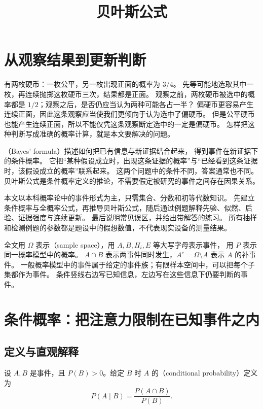 \documentclass[UTF8]{ctexart}
\title{贝叶斯公式}
\author{}
\date{}
\begin{document}
\maketitle
\tableofcontents

\section{从观察结果到更新判断}
\label{sec:bayes-introduction}

有两枚硬币：一枚公平，另一枚出现正面的概率为 $3/4$。
先等可能地选取其中一枚，再连续抛掷这枚硬币三次，结果都是正面。
观察之前，两枚硬币被选中的概率都是 $1/2$；观察之后，是否仍应当认为两种可能各占一半？
偏硬币更容易产生连续正面，因此这条观察应当使我们更倾向于认为选中了偏硬币。
但是公平硬币也能产生连续正面，所以不能仅凭这条观察断定选中的一定是偏硬币。
怎样把这种判断写成准确的概率计算，就是本文要解决的问题。

（Bayes' formula）描述如何把已有信息与新证据结合起来，
得到事件在新证据下的条件概率。
它把“某种假设成立时，出现这条证据的概率”与“已经看到这条证据时，该假设成立的概率”联系起来。
这两个问题中的条件不同，答案通常也不同。
贝叶斯公式是条件概率定义的推论，不需要假定被研究的事件之间存在因果关系。

本文以本科概率论中的事件形式为主，只需集合、分数和初等代数知识。
先建立条件概率与全概率公式，再推导贝叶斯公式，随后通过例题解释先验、似然、后验、证据强度与连续更新。
最后说明常见误区，并给出带解答的练习。
所有抽样和检测例题的参数都是题设中的假想数值，不代表现实设备的测量结果。

全文用 $\Omega$ 表示（sample space），用 $A,B,H_i,E$ 等大写字母表示事件，
用 $P$ 表示同一概率模型中的概率。
$A\cap B$ 表示两事件同时发生，$A^c=\Omega\setminus A$ 表示 $A$ 的补事件。
一般概率模型中的事件属于给定的事件族；有限样本空间中，可以把每个子集都作为事件。
条件竖线右边写已知信息，左边写在这些信息下仍要判断的事件。

\section{条件概率：把注意力限制在已知事件之内}
\label{sec:bayes-conditional}

\subsection{定义与直观解释}

\begin{definition}[条件概率]
\label{def:bayes-conditional}
设 $A,B$ 是事件，且 $P(B)>0$。给定 $B$ 时 $A$ 的（conditional probability）定义为
\begin{equation}
  P(A\mid B)=\frac{P(A\cap B)}{P(B)}.
  \label{eq:bayes-conditional}
\end{equation}
\end{definition}
\end{document}
